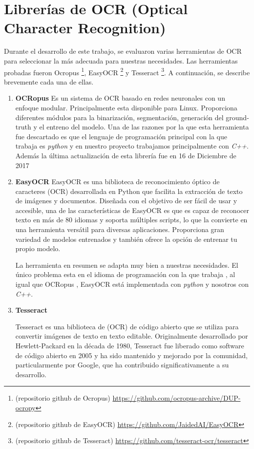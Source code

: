 \section{Librerías de OCR (Optical Character Recognition)}
\label{sec:Seleccion de libreria de OCR}
Durante el desarrollo de este trabajo, se evaluaron varias herramientas de OCR para seleccionar la más adecuada para nuestras necesidades. Las herramientas probadas fueron Ocropus	\footnote{(repositorio github de Ocropus) \url{https://github.com/ocropus-archive/DUP-ocropy} }, EasyOCR	\footnote{(repositorio github de EasyOCR) \url{https://github.com/JaidedAI/EasyOCR} } y Tesseract	\footnote{(repositorio github de Tesseract) \url{https://github.com/tesseract-ocr/tesseract} }. A continuación, se describe brevemente cada una de ellas.
\begin{enumerate}
	\item \textbf{OCRopus}
	Es un sistema de OCR basado en redes neuronales con un enfoque modular.
	Principalmente esta disponible para Linux. Proporciona diferentes módulos para la binarización, segmentación, generación del ground-truth y el entreno del modelo.
	Una de las razones por la que esta herramienta fue descartado es que el lenguaje de programación principal con la que trabaja es \emph{python} y en nuestro proyecto trabajamos principalmente con \emph{C++}. Además la última actualización de esta librería fue en 16 de Diciembre de 2017
	
	\item \textbf{EasyOCR}
	EasyOCR es una biblioteca de reconocimiento óptico de caracteres (OCR) desarrollada en Python que facilita la extracción de texto de imágenes y documentos. Diseñada con el objetivo de ser fácil de usar y accesible, una de las características de EasyOCR es que es capaz de reconocer texto en más de 80 idiomas y soporta múltiples scripts, lo que la convierte en una herramienta versátil para diversas aplicaciones.
	Proporciona gran variedad de modelos entrenados y también ofrece la opción de entrenar tu propio modelo.
	
	La herramienta en resumen se adapta muy bien a nuestras necesidades. El único problema esta en el idioma de programación con la que trabaja , al igual que OCRopus , EasyOCR está implementada con \emph{python} y nosotros con \emph{C++}.
	
	\item \textbf{Tesseract}
	
	Tesseract es una biblioteca de (OCR) de código abierto que se utiliza para convertir imágenes de texto en texto editable. Originalmente desarrollado por Hewlett-Packard en la década de 1980, Tesseract fue liberado como software de código abierto en 2005 y ha sido mantenido y mejorado por la comunidad, particularmente por Google, que ha contribuido significativamente a su desarrollo.
	

\end{enumerate}
